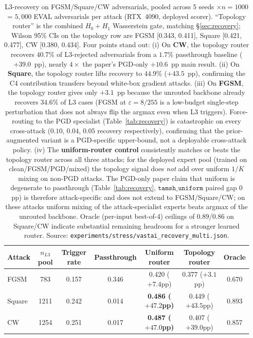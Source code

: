 \begin{table}[h]
\centering
\small
\begin{tabular}{lcccccc}
\toprule
Attack & $n_{L3}$ pool & Trigger rate & Passthrough & Uniform router & Topology router & Oracle \\
\midrule
FGSM   & 783  & 0.157 & 0.346 & 0.420 ($+7.4$pp) & 0.377 ($+3.1$pp) & 0.670 \\
Square & 1211 & 0.242 & 0.014 & \textbf{0.486 ($+47.2$pp)} & 0.449 ($+43.5$pp) & 0.893 \\
CW     & 1254 & 0.251 & 0.017 & \textbf{0.487 ($+47.0$pp)} & 0.407 ($+39.0$pp) & 0.857 \\
\bottomrule
\end{tabular}
\caption{L3-recovery on FGSM/Square/CW adversarials, pooled across 5
seeds $\times n{=}1000$ = $5{,}000$ EVAL adversarials per attack
(RTX~4090, deployed scorer). ``Topology router'' is the combined
$H_0{+}H_1$ Wasserstein gate, matching \S\ref{sec:recovery}; Wilson
95\% CIs on the topology row are FGSM [0.343, 0.411], Square [0.421,
0.477], CW [0.380, 0.434]. Four points stand out:
(i) On \textbf{CW}, the topology router recovers $40.7\%$ of
L3-rejected adversarials from a $1.7\%$ passthrough baseline
($+39.0$~pp), nearly $4{\times}$ the paper's PGD-only $+10.6$~pp
main result.
(ii) On \textbf{Square}, the topology router lifts recovery to
$44.9\%$ ($+43.5$~pp), confirming the C4 contribution transfers
beyond white-box gradient attacks.
(iii) On \textbf{FGSM}, the topology router gives only $+3.1$~pp
because the unrouted backbone already recovers $34.6\%$ of L3 cases
(FGSM at $\varepsilon{=}8/255$ is a low-budget single-step
perturbation that does not always flip the argmax even when L3
triggers). Force-routing to the PGD specialist (Table~\ref{tab:recovery})
is catastrophic on every cross-attack ($0.10$, $0.04$, $0.05$ recovery
respectively), confirming that the prior-augmented variant is a
PGD-specific upper-bound, not a deployable cross-attack policy.
(iv) The \textbf{uniform-router control} consistently matches or
beats the topology router across all three attacks; for the
deployed expert pool (trained on clean/FGSM/PGD/mixed) the topology
signal does \emph{not} add over uniform $1/K$ mixing on
non-PGD attacks. The PGD-only paper claim that uniform is degenerate
to passthrough (Table~\ref{tab:recovery}, $\texttt{tamsh\_uniform}$
paired gap $0$~pp) is therefore attack-specific and does not extend
to FGSM/Square/CW; on these attacks uniform mixing of the
attack-specialist experts beats argmax of the unrouted backbone.
Oracle (per-input best-of-4) ceilings of $0.89$/$0.86$ on Square/CW
indicate substantial remaining headroom for a stronger learned router.
Source: \texttt{experiments/stress/vastai\_recovery\_multi.json}.}
\label{tab:recovery_multi}
\end{table}

